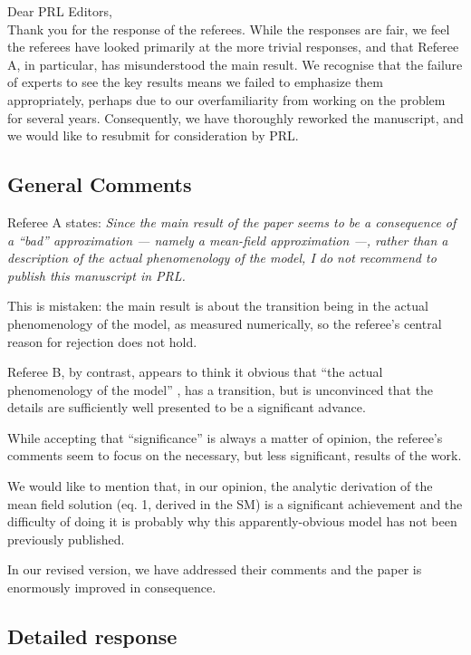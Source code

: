 \documentclass[a4paper,10pt]{article}
\title{}
\author{Joshua DM Hellier and Graeme J Ackland}
\begin{document}
\maketitle

 Dear PRL Editors, \\ 

 Thank you for the response of the referees. While the responses are
fair, we feel the referees have looked primarily at the more trivial
responses, and that Referee A, in particular, has misunderstood the
main result. We recognise that the failure of experts to see the key
results means we failed to emphasize them appropriately, perhaps due
to our overfamiliarity from working on the problem for several
years. Consequently, we have thoroughly reworked the manuscript, and
we would like to resubmit for consideration by PRL.

\subsection*{General Comments}
  Referee A states:
{\it  Since the main result of the paper seems to be a consequence of a ``bad'' approximation --- namely a mean-field approximation ---, rather than a description of the actual phenomenology of the model, I do not recommend to publish this manuscript in PRL.}

  This is mistaken: the main result is about the transition being in the actual phenomenology of the model, as measured numerically, so the referee's central reason for rejection does not hold.
 
  Referee B, by contrast, appears to think it obvious that ``the actual phenomenology of the model'' , has a transition, but is unconvinced that the details are sufficiently well presented to be a significant advance.

 While accepting that ``significance'' is always a matter of opinion,
 the referee's comments seem to focus on the necessary, but less
 significant, results of the work.
 
We would like to mention that, in our opinion, the analytic derivation
of the mean field solution (eq. 1, derived in the SM) is a significant
achievement and the difficulty of doing it is probably why this
apparently-obvious model has not been previously published.


In our revised version, we have addressed their comments and the paper is enormously improved in consequence.
 
 
\subsection*{Detailed response}
\end{document}
